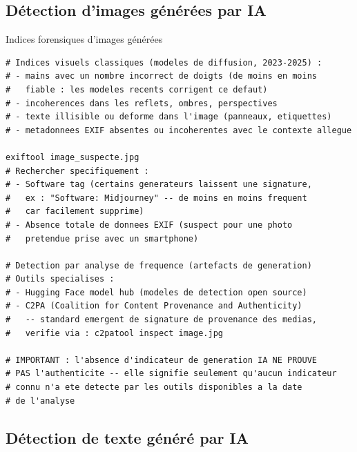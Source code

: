 \subsection{Détection d'images générées par IA}

\begin{boxoutils}{Indices forensiques d'images générées}
\begin{lstlisting}[language=bash_forensique]
# Indices visuels classiques (modeles de diffusion, 2023-2025) :
# - mains avec un nombre incorrect de doigts (de moins en moins
#   fiable : les modeles recents corrigent ce defaut)
# - incoherences dans les reflets, ombres, perspectives
# - texte illisible ou deforme dans l'image (panneaux, etiquettes)
# - metadonnees EXIF absentes ou incoherentes avec le contexte allegue

exiftool image_suspecte.jpg
# Rechercher specifiquement :
# - Software tag (certains generateurs laissent une signature,
#   ex : "Software: Midjourney" -- de moins en moins frequent
#   car facilement supprime)
# - Absence totale de donnees EXIF (suspect pour une photo
#   pretendue prise avec un smartphone)

# Detection par analyse de frequence (artefacts de generation)
# Outils specialises : 
# - Hugging Face model hub (modeles de detection open source)
# - C2PA (Coalition for Content Provenance and Authenticity)
#   -- standard emergent de signature de provenance des medias,
#   verifie via : c2patool inspect image.jpg

# IMPORTANT : l'absence d'indicateur de generation IA NE PROUVE
# PAS l'authenticite -- elle signifie seulement qu'aucun indicateur
# connu n'a ete detecte par les outils disponibles a la date
# de l'analyse
\end{lstlisting}
\end{boxoutils}

\subsection{Détection de texte généré par IA}

